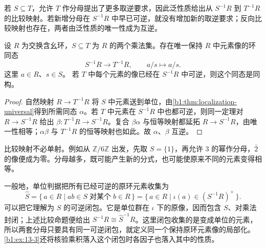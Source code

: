\ProseParagraphBreak
若 \(S\subseteq T\)，允许 \(T\) 作分母提出了更多取逆要求，因此泛性质给出从 \(S^{-1}R\) 到 \(T^{-1}R\) 的比较映射。若新增分母在 \(S^{-1}R\) 中早已可逆，就没有增加新的取逆要求；反向比较映射也存在，两者由泛性质的唯一性成为互逆。

\begin{proposition}\label{b1:prop:localization-comparison}
	设 \(R\) 为交换含幺环，\(S\subseteq T\) 为 \(R\) 的两个乘法集。存在唯一保持 \(R\) 中元素像的环同态
	\[
		S^{-1}R\longrightarrow T^{-1}R,\qquad a/s\longmapsto a/s.
	\]
	这里 \(a\in R\)、\(s\in S\)。 若 \(T\) 中每个元素的像已经在 \(S^{-1}R\) 中可逆，则这个同态是同构。
\end{proposition}
\begin{proof}
	自然映射 \(R\rightarrow T^{-1}R\) 将 \(S\) 中元素送到单位，由\cref{b1:thm:localization-universal}得到所需同态 \(\alpha\)。若 \(T\) 中元素在 \(S^{-1}R\) 中也都可逆，则同一定理对 \(R\rightarrow S^{-1}R\) 给出 \(\beta:T^{-1}R\rightarrow S^{-1}R\)。复合 \(\beta\alpha\) 与恒等映射都延拓 \(R\rightarrow S^{-1}R\)，由唯一性相等；\(\alpha\beta\) 与 \(T^{-1}R\) 的恒等映射也如此。故 \(\alpha\)、\(\beta\) 互逆。
\end{proof}
比较映射不必单射。例如从 \(\mathbb Z/6\mathbb Z\) 出发，先取 \(S=\{1\}\)，再允许 \(3\) 的幂作分母，\(\bar2\) 的像便成为零。分母越多，既可能产生新的分式，也可能使原来不同的元素变得相等。

\ProseParagraphBreak
一般地，单位判据把所有已经可逆的原环元素收集为
\[
	\widehat S =\{\,a\in R\mid ab\in S\;\text{对某个}\;b\in R\,\} =\{\,a\in R\mid \iota(a)\in(S^{-1}R)^\times\,\}.
\]
可以把它理解为 \(S\) 的可逆闭包。它是单位群在 \(\iota\) 下的原像，因而包含 \(S\)、对乘法封闭；上述比较命题便给出 \(S^{-1}R\cong\widehat S^{-1}R\)。这里闭包收集的是变成单位的元素，所以两套分母只要具有同一可逆闭包，就定义同一个保持原环元素像的局部化。\cref{b1:ex:13-3}还将核验乘积落入这个闭包时各因子也落入其中的性质。
